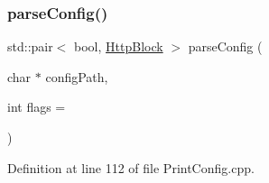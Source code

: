 \subsubsection{\texorpdfstring{parse\+Config()}{parseConfig()}}
{\footnotesize\ttfamily std\+::pair$<$ bool, \hyperlink{classft_1_1_http_block}{Http\+Block} $>$ parse\+Config (\begin{DoxyParamCaption}\item[{char $\ast$}]{config\+Path,  }\item[{int}]{flags = {} }\end{DoxyParamCaption})\hspace{0.3cm}{\ttfamily [static]}}



Definition at line 112 of file Print\+Config.\+cpp.


